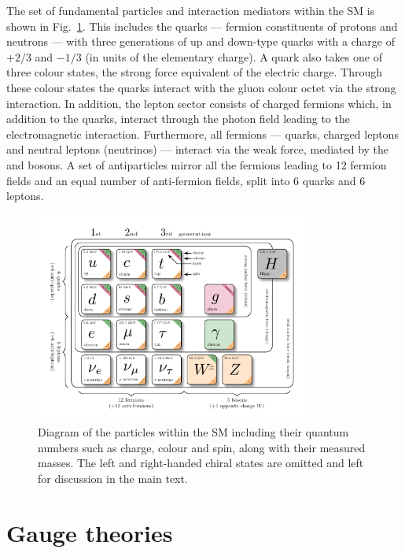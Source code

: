 The set of fundamental particles and interaction mediators within the SM is
shown in Fig.~\ref{fig:particle}. This includes the quarks --- fermion
constituents of protons and neutrons --- with three generations of up and
down-type quarks with a charge of $+2/3$ and $-1/3$ (in units of the
elementary charge). A quark also takes one of three colour states, the strong
force equivalent of the electric charge. Through these colour states the
quarks interact with the gluon colour octet via the strong interaction. In
addition, the lepton sector consists of charged fermions which, in addition to
the quarks, interact through the photon field leading to the electromagnetic
interaction. Furthermore, all fermions --- quarks, charged leptons and neutral
leptons (neutrinos) --- interact via the weak force, mediated by the \PW and
\PZ bosons. A set of antiparticles mirror all the fermions leading to 12
fermion fields and an equal number of anti-fermion fields, split into 6 quarks
and 6 leptons. 

\begin{figure}[htb]
    \centering
    \includegraphics[width=0.8\textwidth]{diagrams/tikz/standard_model/standard_model.pdf}
    \caption[Summary of the standard model particles.]{
        Diagram of the particles within the SM including their quantum numbers such as charge, colour and spin, along with their measured masses. The left and right-handed chiral states are omitted and left for discussion in the main text.
    }
    \label{fig:particle}
\end{figure}


\section{Gauge theories}

